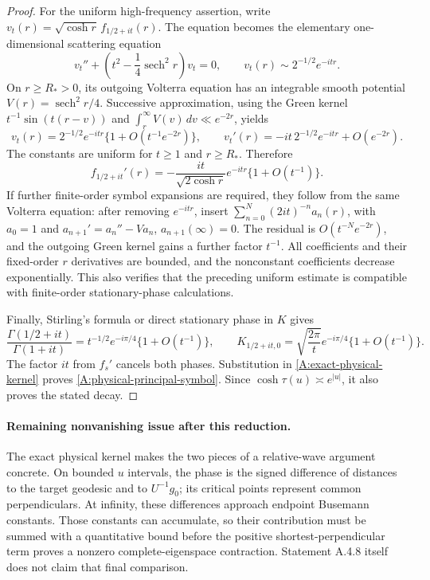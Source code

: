 \begin{proof}
For the uniform high-frequency assertion, write
$v_t(r)=\sqrt{\cosh r}\,f_{1/2+it}(r)$.
The equation becomes the elementary one-dimensional scattering equation
\[
 v_t''+\left(t^2-\frac14\operatorname{sech}^2r\right)v_t=0,
 \qquad v_t(r)\sim 2^{-1/2}e^{-itr}.
\]
On $r\geq R_*>0$, its outgoing Volterra equation has an
integrable smooth potential $V(r)=\operatorname{sech}^2r/4$.
Successive approximation, using the Green kernel
$t^{-1}\sin(t(r-v))$ and
$\int_r^\infty V(v)\,dv\ll e^{-2r}$, yields
\[
 v_t(r)=2^{-1/2}e^{-itr}
       \{1+O(t^{-1}e^{-2r})\},\qquad
 v_t'(r)=-it\,2^{-1/2}e^{-itr}+O(e^{-2r}).
\]
The constants are uniform for $t\geq1$ and $r\geq R_*$.
Therefore
\[
 f_{1/2+it}'(r)=
 -\frac{it}{\sqrt{2\cosh r}}e^{-itr}\{1+O(t^{-1})\}.
\]
If further finite-order symbol expansions are required, they follow
from the same Volterra equation: after removing $e^{-itr}$,
insert $\sum_{n=0}^N(2it)^{-n}a_n(r)$, with $a_0=1$ and
$a_{n+1}'=a_n''-Va_n$, $a_{n+1}(\infty)=0$.
The residual is $O(t^{-N}e^{-2r})$, and the outgoing Green kernel
gains a further factor $t^{-1}$. All coefficients and their fixed-order
$r$ derivatives are bounded, and the nonconstant coefficients decrease
exponentially. This also verifies that the preceding uniform
estimate is compatible with finite-order stationary-phase calculations.

Finally, Stirling's formula or direct stationary phase in $K$ gives
\[
 \frac{\Gamma(1/2+it)}{\Gamma(1+it)}
       =t^{-1/2}e^{-i\pi/4}\{1+O(t^{-1})\},\qquad
 K_{1/2+it,0}=
       \sqrt{\frac{2\pi}{t}}e^{-i\pi/4}\{1+O(t^{-1})\}.
\]
The factor $it$ from $f_s'$ cancels both phases.
Substitution in \eqref{A:exact-physical-kernel} proves
\eqref{A:physical-principal-symbol}. Since
$\cosh\tau(u)\asymp e^{|u|}$, it also proves the stated decay.
\end{proof}

\paragraph{Remaining nonvanishing issue after this reduction.}
The exact physical kernel makes the two pieces of a relative-wave
argument concrete. On bounded $u$ intervals, the phase is the signed
difference of distances to the target geodesic and to $U^{-1}g_0$;
its critical points represent common perpendiculars. At infinity,
these differences approach endpoint Busemann constants.
Those constants can accumulate, so their contribution must be summed
with a quantitative bound before the positive shortest-perpendicular
term proves a nonzero complete-eigenspace contraction.
Statement A.4.8 itself does not claim that final comparison.
